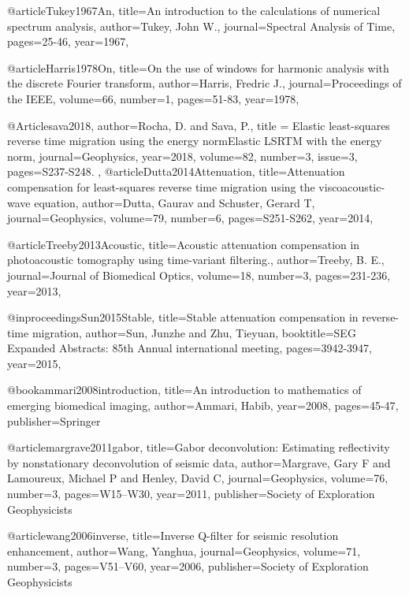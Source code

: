 {@article{Tukey1967An,
  title={An introduction to the calculations of numerical spectrum analysis},
  author={Tukey, John W.},
  journal={Spectral Analysis of Time},
  pages={25-46},
  year={1967},
}

@article{Harris1978On,
  title={On the use of windows for harmonic analysis with the discrete {F}ourier transform},
  author={Harris, Fredric J.},
  journal={Proceedings of the IEEE},
  volume={66},
  number={1},
  pages={51-83},
  year={1978},
}

@Article{sava2018,
  author={Rocha, D. and Sava, P.},
  title = {Elastic least-squares reverse time migration using the energy normElastic LSRTM with the energy norm},
  journal={Geophysics},
  year=2018,
  volume=82,
  number=3,
  issue=3,
  pages={S237-S248. },
}
@article{Dutta2014Attenuation,
  title={Attenuation compensation for least-squares reverse time migration using the viscoacoustic-wave equation},
  author={Dutta, Gaurav and Schuster, Gerard T},
  journal={Geophysics},
  volume={79},
  number={6},
  pages={S251-S262},
  year={2014},
}

@article{Treeby2013Acoustic,
  title={Acoustic attenuation compensation in photoacoustic tomography using time-variant filtering.},
  author={Treeby, B. E.},
  journal={Journal of Biomedical Optics},
  volume={18},
  number={3},
  pages={231-236},
  year={2013},
}

@inproceedings{Sun2015Stable,
  title={Stable attenuation compensation in reverse-time migration},
  author={Sun, Junzhe and Zhu, Tieyuan},
  booktitle={SEG Expanded Abstracts: 85th Annual international meeting},
  pages={3942-3947},
  year={2015},
}

@book{ammari2008introduction,
  title={An introduction to mathematics of emerging biomedical imaging},
  author={Ammari, Habib},
  year={2008},
  pages={45-47},
  publisher={Springer}
}


@article{margrave2011gabor,
  title={Gabor deconvolution: Estimating reflectivity by nonstationary deconvolution of seismic data},
  author={Margrave, Gary F and Lamoureux, Michael P and Henley, David C},
  journal={Geophysics},
  volume={76},
  number={3},
  pages={W15--W30},
  year={2011},
  publisher={Society of Exploration Geophysicists}
}

@article{wang2006inverse,
  title={Inverse {Q}-filter for seismic resolution enhancement},
  author={Wang, Yanghua},
  journal={Geophysics},
  volume={71},
  number={3},
  pages={V51--V60},
  year={2006},
  publisher={Society of Exploration Geophysicists}
}

}
